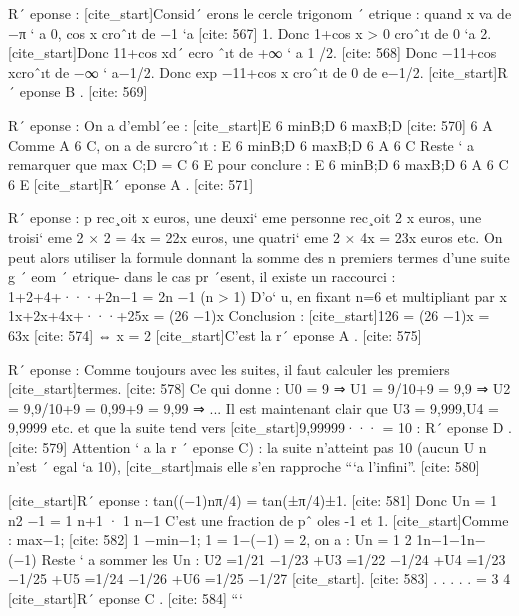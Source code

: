 R´ eponse :
 [cite_start]Consid´ erons le cercle trigonom ´ etrique : quand x va de −π ` a 0, cos x croˆıt de −1 `a [cite: 567]
1.
 Donc 1+cos x > 0 croˆıt de 0 `a 2. 
 [cite_start]Donc 11+cos xd´ ecro ˆıt de +∞ ` a 1 /2. [cite: 568]
Donc −11+cos xcroˆıt de −∞ ` a−1/2.
 Donc exp −11+cos x croˆıt de 0 de e−1/2.
 [cite_start]R´ eponse B . [cite: 569]

R´ eponse : On a d’embl´ee : 
 [cite_start]E 6 min{B;D} 6 max{B;D} [cite: 570]
6 A
 Comme A 6 C, on a de surcroˆıt :
 E 6 min{B;D} 6 max{B;D} 6 A 6 C
 Reste ` a remarquer que max {C;D} = C 6 E pour conclure :
 E 6 min{B;D} 6 max{B;D} 6 A 6 C 6 E
 [cite_start]R´ eponse A . [cite: 571]

R´ eponse : p rec¸oit x euros, une deuxi` eme personne rec¸oit 2 x euros, une
 troisi` eme 2 × 2 = 4x = 22x euros, une quatri` eme 2 × 4x = 23x euros etc. On
 peut alors utiliser la formule donnant la somme des n premiers termes d’une suite
 g
 ´ 
 eom
 ´ etrique- dans le cas pr ´esent, il existe un raccourci : 
 1+2+4+···+2n−1 = 2n −1 (n > 1)
 D’o` u, en fixant n=6 et multipliant par x
 1x+2x+4x+···+25x = (26 −1)x
 Conclusion :
 [cite_start]126 = (26 −1)x = 63x [cite: 574]
⇔ x = 2
 [cite_start]C’est la r´ eponse A . [cite: 575]

R´ eponse : Comme toujours avec les suites, il faut calculer les premiers
 [cite_start]termes. [cite: 578]
Ce qui donne :
 U0 = 9 ⇒ U1 = 9/10+9 = 9,9 ⇒ U2 = 9,9/10+9 = 0,99+9 = 9,99 ⇒ ...
 Il est maintenant clair que U3 = 9,999,U4 = 9,9999 etc. et que la suite tend vers
 [cite_start]9,99999··· = 10 : R´ eponse D . [cite: 579]
Attention ` a la r ´ eponse C) : la suite n’atteint pas 10 (aucun U n n’est ´ egal `a 10), 
 [cite_start]mais elle s’en rapproche “`a l’infini”. [cite: 580]

[cite_start]R´ eponse : tan((−1)nπ/4) = tan(±π/4)±1. [cite: 581]
Donc
 Un =
 1
 n2 −1
 =
 1
 n+1
 ·
 1
 n−1
 C’est une fraction de pˆ oles -1 et 1.
 [cite_start]Comme : max{−1; [cite: 582]
1} −min{−1; 1} = 1−(−1) = 2, on a :
 Un =
 1
 2 1n−1−1n−(−1) 
 Reste ` a sommer les Un :
 U2 =1/21 −1/23
 +U3 =1/22 −1/24
 +U4 =1/23 −1/25
 +U5 =1/24 −1/26
 +U6 =1/25 −1/27
 [cite_start]. [cite: 583]
.
 .
 .
 .
 .
 =
 3
 4
 [cite_start]R´ eponse C . [cite: 584]
```